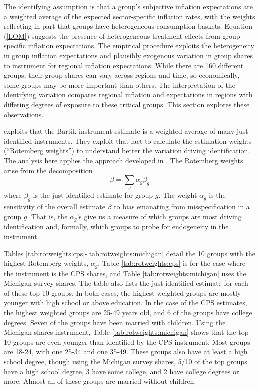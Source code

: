 \documentclass[12pt]{article}
\begin{document}
The identifying assumption is that a group's subjective inflation expectations are a weighted average of the expected sector-specific inflation rates, with the weights reflecting in part that groups have heterogeneous consumption baskets. Equation (\ref{LOM}) suggests the presence of heterogeneous treatment effects from group-specific inflation expectations. The empirical procedure exploits the heterogeneity in group inflation expectations and plausibly exogenous variation in group shares to instrument for regional inflation expectations. While there are 160 different groups, their group shares can vary across regions and time, so economically, some groups may be more important than others. The interpretation of the identifying variation compares regional inflation and expectations in regions with differing degrees of exposure to these critical groups. This section explores these observations.

\cite{Pinkhametal:AER2020} exploits that the Bartik instrument estimate is a weighted average of many just identified instruments. They exploit that fact to calculate the estimation weights (``Rotemberg weights'') to understand better the variation driving identification. The analysis here applies the approach developed in \cite{Pinkhametal:AER2020}. The Rotemberg weights arise from the decomposition
$$ \beta = \sum_g \alpha_g\beta_g$$
where $\beta_g$ is the just identified estimate for group $g$. The weight $\alpha_g$ is the sensitivity of the overall estimate $\beta$ to bias emanating from misspecification in a group $g$. That is, the $\alpha_g$'s give us a measure of which groups are most driving identification and, formally, which groups to probe for endogeneity in the instrument.  




Tables \ref{tab:rotweights:cps}-\ref{tab:rotweights:michigan} detail the 10 groups with the highest Rotemberg weights, $\alpha_g$. Table \ref{tab:rotweights:cps} is for the case where the instrument is the CPS shares, and Table \ref{tab:rotweights:michigan} uses the Michigan survey shares. The table also lists the just-identified estimate for each of these top-10 groups. In both cases, the highest weighted groups are mostly younger with high school or above education. In the case of the CPS estimates, the highest weighted groups are 25-49 years old, and 6 of the groups have college degrees. Seven of the groups have been married with children. Using the Michigan shares instrument, Table \ref{tab:rotweights:michigan} shows that the top-10 groups are even younger than identified by the CPS instrument. Most groups are 18-24, with one 25-34 and one 35-49. These groups also have at least a high school degree, though using the Michigan survey shares, 5/10 of the top groups have a high school degree, 3 have some college, and 2 have college degrees or more. Almost all of these groups are married without children.
\end{document}

